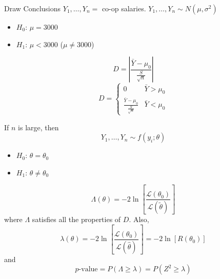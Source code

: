 \begin{Example}{Draw Conclusions}{}
    $ Y_1,\ldots ,Y_n = $ co-op salaries. $ Y_1,\ldots ,Y_n \sim N(\mu,\sigma^2) $
    \begin{itemize}
        \item $ H_0 $: $ \mu=3000 $
        \item $ H_1 $: $ \mu<3000 $ ($ \mu\neq 3000 $)
    \end{itemize}
    \[ D=\left|\frac{\bar{Y}-\mu_0}{\frac{S}{\sqrt{n}}} \right| \]
    \[ D=
        \begin{cases}
            0                                        & \bar{Y}>\mu_0 \\
            \frac{\bar{Y}-\mu_0}{\frac{S}{\sqrt{n}}} & \bar{Y}<\mu_0
        \end{cases} \]
\end{Example}

If $ n $ is large, then
\[ Y_1,\ldots ,Y_n \sim f(y_i;\theta) \]
\begin{itemize}
    \item $ H_0 $: $ \theta=\theta_0 $
    \item $ H_1 $: $ \theta\neq \theta_0 $
\end{itemize}
\[ \Lambda(\theta)=-2\ln\left[ \frac{\mathcal{L}(\theta_0)}{\mathcal{L}(\tilde{\theta})} \right] \]
where $ \Lambda $ satisfies all the properties of $ D $. Also,
\[ \lambda(\theta)=-2\ln\left[ \frac{\mathcal{L}(\theta_0)}{\mathcal{L}(\hat{\theta})}\right]
    =-2\ln\left[ R(\theta_0) \right] \]
and
\[ p\text{-value}=P(\Lambda\geqslant \lambda)=P(Z^2\geqslant \lambda) \]
